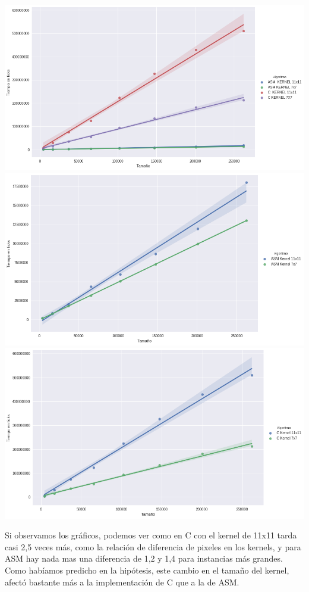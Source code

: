 \begin{center} 
	\includegraphics[scale=0.5]{img/maxCloser_KERNEL.png}
	\includegraphics[scale=0.5]{img/maxCloser_KERNEL_ASM.png}
	\includegraphics[scale=0.5]{img/maxCloser_KERNEL_C.png}
\end{center}

Si observamos los gráficos, podemos ver como en C con el kernel de 11x11 tarda casi 2,5 veces más, como la relación de diferencia de pixeles en los kernels, y para ASM hay nada mas una diferencia de 1,2 y 1,4 para instancias más grandes. Como habíamos predicho en la hipótesis, este cambio en el tamaño del kernel, afectó bastante más a la implementación de C que a la de ASM.


